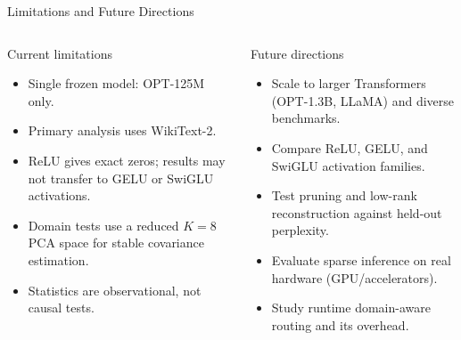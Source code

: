 \documentclass[aspectratio=169,10pt]{beamer}
\begin{document}
\begin{frame}{Limitations and Future Directions}
\begin{columns}[T,onlytextwidth]
\begin{block}{Current limitations}
\begin{itemize}
  \item Single frozen model: OPT-125M only.
  \item Primary analysis uses WikiText-2.
  \item ReLU gives exact zeros; results may not transfer to GELU or SwiGLU activations.
  \item Domain tests use a reduced $K=8$ PCA space for stable covariance estimation.
  \item Statistics are observational, not causal tests.
\end{itemize}
\end{block}
\begin{exampleblock}{Future directions}
\begin{itemize}
  \item Scale to larger Transformers (OPT-1.3B, LLaMA) and diverse benchmarks.
  \item Compare ReLU, GELU, and SwiGLU activation families.
  \item Test pruning and low-rank reconstruction against held-out perplexity.
  \item Evaluate sparse inference on real hardware (GPU/accelerators).
  \item Study runtime domain-aware routing and its overhead.
\end{itemize}
\end{exampleblock}
\end{columns}
\end{frame}
\end{document}
